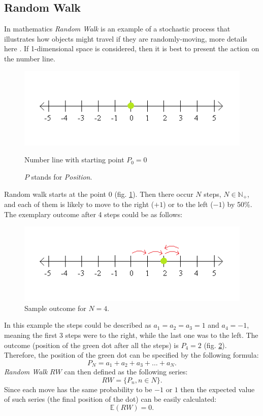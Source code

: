     \subsection{Random Walk}
        In mathematics \textit{Random Walk} is an example of a stochastic process that illustrates how objects might travel if they are randomly-moving, more details here \cite{randomWalk}.
        If 1-dimensional space is considered, then it is best to present the action on the number line.
        \begin{figure}[H]
            \centering
            \includegraphics{img/numberLine.png}
            \caption{Number line with starting point $P_0=0$}
            \caption*{$P$ stands for \textit{Position}.}
            \label{fig:numberLine_start}
        \end{figure}
        Random walk starts at the point 0 (fig. \ref{fig:numberLine_start}). Then there occur $N$ steps, $N \in \mathbb{N}_+$, and each of them is likely to move to the right ($+1$) or to the left ($-1$) by 50\%. The exemplary outcome after 4 steps could be as follows:
        \begin{figure}[H]
            \centering
            \includegraphics{img/numberLine_end.png}
            \caption{Sample outcome for $N=4$.}
            \label{fig:numberLine_end}
        \end{figure}
        In this example the steps could be described as $a_1 = a_2 = a_3 = 1$ and $a_4 = -1$, meaning the first 3 steps were to the right, while the last one was to the left. The outcome (position of the green dot after all the steps) is $P_4 = 2$ (fig. \ref{fig:numberLine_end}).
        Therefore, the position of the green dot can be specified by the following formula:
        \[  %
        P_N = a_1 + a_2 + a_3 + \ldots + a_N
        .
        \]
        \textit{Random Walk} $RW$ can then defined as the following series:
        \[
        RW = \{P_n, n \in N\}
        .
        \]
        Since each move has the same probability to be $-1$ or $1$ then the expected value of such series (the final position of the dot) can be easily calculated:
        \[
        \mathbb{E}(RW) = 0
        .
        \]
        

